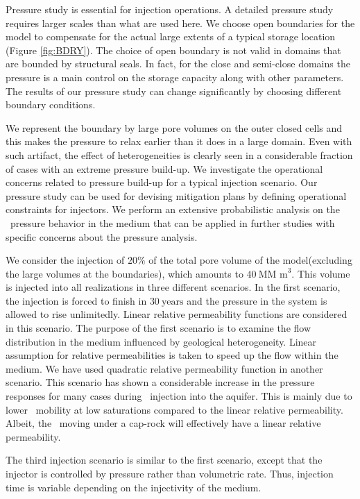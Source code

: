 Pressure study is essential for injection operations. A detailed pressure study requires larger scales than what are used here. We choose open boundaries for the model to compensate for the actual large extents of a typical storage location (Figure \ref{fig:BDRY}). The choice of open boundary is not valid in domains that are bounded by structural seals. In fact, for the close and semi-close domains the pressure is a main control on the storage capacity along with other parameters. The results of our pressure study can change significantly by choosing different boundary conditions. 

We represent the boundary by large pore volumes on the outer closed cells and this makes the pressure to relax earlier than it does in a large domain. Even with such artifact, the effect of heterogeneities is clearly seen in a considerable fraction of cases with an extreme pressure build-up. We investigate the operational concerns  related to pressure build-up for a typical injection scenario. Our pressure study can be used for devising mitigation plans by defining operational constraints for injectors. We perform an extensive probabilistic analysis on the \coo\ pressure behavior in the medium that can be applied in further studies with specific concerns about the pressure analysis.   

We consider the injection of $20\%$ of the total pore volume of the model(excluding the large volumes at the boundaries), which amounts to $40~\mbox{MM m}^3$. This volume is injected into all realizations
in three different scenarios. In the first scenario, the injection is forced to
finish in
$30~\mbox{years}$ and the pressure in the system is allowed to rise
unlimitedly. Linear relative permeability functions are considered in this
scenario. The purpose of the first scenario is to examine the flow distribution in the medium influenced by geological heterogeneity. Linear assumption for
relative permeabilities is taken to speed up the flow within the medium. We have used quadratic relative permeability function in another scenario. This scenario has shown a considerable increase in the pressure responses for many cases during \coo\ injection into the  aquifer. This is mainly due to lower \coo\ mobility at low saturations compared to the linear relative permeability. Albeit, the \coo\ moving under a cap-rock will effectively have a linear relative permeability.

The third injection scenario is similar to the first scenario, except that the injector is controlled by pressure rather than volumetric rate. Thus, injection time is variable depending on the injectivity of the medium.

